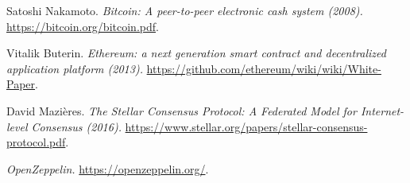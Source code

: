 
\newpage

\begin{thebibliography}{99} %

   Satoshi Nakamoto.
  \newblock \textit{Bitcoin: A peer-to-peer electronic cash system (2008).}
  \newblock \url{https://bitcoin.org/bitcoin.pdf}.

   Vitalik Buterin.
  \newblock \textit{Ethereum: a next generation smart contract and decentralized application platform (2013).}
  \newblock \url{https://github.com/ethereum/wiki/wiki/White-Paper}.

   David Mazi\`eres.
  \newblock \textit{The Stellar Consensus Protocol: A Federated Model for Internet-level Consensus (2016).}
  \newblock \url{https://www.stellar.org/papers/stellar-consensus-protocol.pdf}.

   \textit{OpenZeppelin.}
  \newblock \url{https://openzeppelin.org/}.

\end{thebibliography}
